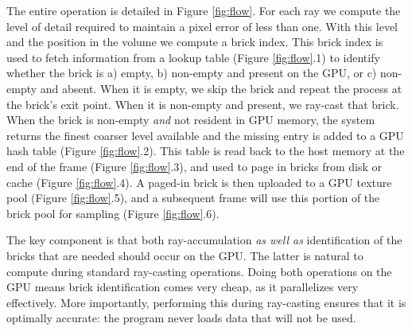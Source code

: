 The entire operation is detailed in Figure \ref{fig:flow}. For each
ray we compute the level of detail required to maintain a pixel error
of less than one. With this level and the position in the volume we
compute a brick index.  This brick index is used to fetch information
from a lookup table
(Figure \ref{fig:flow}.1) to identify whether the brick is a) empty, b)
non-empty and present on the GPU, or c) non-empty and absent. When it
is empty, we skip the brick and repeat the process at the brick's exit
point.  When it is non-empty and present, we ray-cast that brick. When
the brick is non-empty \emph{and} not resident in GPU memory, the
system returns the finest coarser level available and the missing entry
is added to a GPU hash table (Figure
\ref{fig:flow}.2). This table is read back to the host memory at the
end of the frame (Figure \ref{fig:flow}.3), and used to page in bricks
from
disk or cache (Figure \ref{fig:flow}.4).  A paged-in brick is then
uploaded to a GPU texture pool
(Figure \ref{fig:flow}.5), and a subsequent frame will use this
portion of the brick pool for sampling (Figure \ref{fig:flow}.6).


The key component is that both ray-accumulation \emph{as well
as} identification of the bricks that are needed should occur
on the GPU.  The latter is natural to compute during standard
ray-casting operations.  Doing both operations on the GPU means brick
identification comes very cheap, as it parallelizes very effectively.
More importantly, performing this during ray-casting ensures that it
is optimally accurate: the program never loads data that will not be
used.


